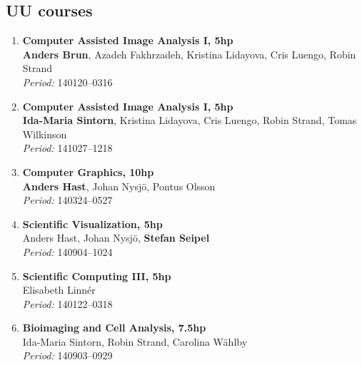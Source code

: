 \subsection{UU courses}
{\small
\begin{enumerate}

%
\item
{\bf Computer Assisted Image Analysis I, 5hp}~\\
{\bf Anders Brun}, Azadeh Fakhrzadeh, Kristina Lidayova, Cris Luengo, Robin Strand~\\
{\em Period:} 140120--0316~

\item
{\bf Computer Assisted Image Analysis I, 5hp}~\\
{\bf Ida-Maria Sintorn}, Kristina Lidayova, Cris Luengo, Robin Strand, Tomas Wilkinson~\\
{\em Period:} 141027--1218~
%
%
\item
{\bf Computer Graphics, 10hp}~\\
{\bf Anders Hast}, Johan Nysj\"{o}, Pontus Olsson~\\
{\em Period:} 140324--0527~
%

\item
{\bf Scientific Visualization, 5hp}~\\
Anders Hast, Johan Nysj\"{o}, {\bf Stefan Seipel}~\\
{\em Period:} 140904--1024~


\item
{\bf Scientific Computing III, 5hp}~\\
Elisabeth Linn\'{e}r~\\
{\em Period:} 140122--0318~


\item
{\bf Bioimaging and Cell Analysis, 7.5hp}~\\
Ida-Maria Sintorn, Robin Strand, Carolina W\"{a}hlby~\\
{\em Period:} 140903--0929~



\end{enumerate}



}

